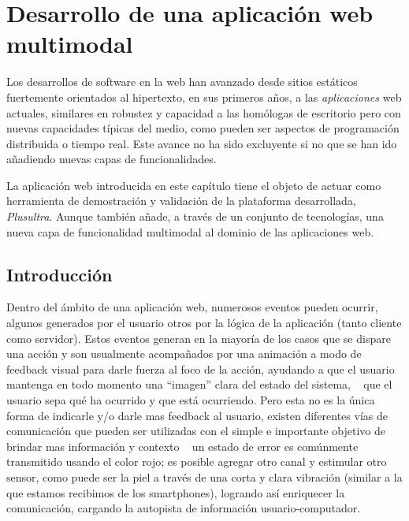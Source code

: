 
\chapter{Desarrollo de una aplicaci\'{o}n web multimodal} %

\label{ch:demo_development} 
Los desarrollos de software en la web han avanzado desde sitios estáticos fuertemente orientados al hipertexto, en sus primeros años, a las \textit{aplicaciones} web actuales, similares en robustez y capacidad a las homólogas de escritorio pero con nuevas capacidades típicas del medio, como pueden ser aspectos de programación distribuida o tiempo real. Este avance no ha sido excluyente si no que se han ido añadiendo nuevas capas de funcionalidades. 

La aplicación web introducida en este capítulo tiene el objeto de actuar como herramienta de demostración y validación de la plataforma desarrollada, \emph{Plusultra}. Aunque también añade, a través de un conjunto de tecnologías, una nueva capa de funcionalidad multimodal al dominio de las aplicaciones web.

\section{Introducción} \label{sec:demo_intro}
Dentro del ámbito de una aplicación web, numerosos eventos pueden ocurrir, algunos generados por el usuario otros por la lógica de la aplicación (tanto cliente como servidor). Estos eventos generan en la mayoría de los casos que se dispare una acción y son usualmente acompañados por una animación a modo de feedback visual para darle fuerza al foco de la acción, ayudando a que el usuario mantenga en todo momento una ``imagen'' clara del estado del sistema, \ie~ que el usuario sepa qué ha ocurrido y que está ocurriendo. Pero esta no es la única forma de indicarle y/o darle mas feedback al usuario, existen diferentes vías de comunicación que pueden ser utilizadas con el simple e importante objetivo de brindar mas información y contexto \Eg~ un estado de error es comúnmente transmitido usando el color rojo; es posible agregar otro canal y estimular otro sensor, como puede ser la piel a través de una corta y clara vibración (similar a la que estamos recibimos de los smartphones), logrando así enriquecer la comunicación, cargando la autopista de información usuario-computador.

